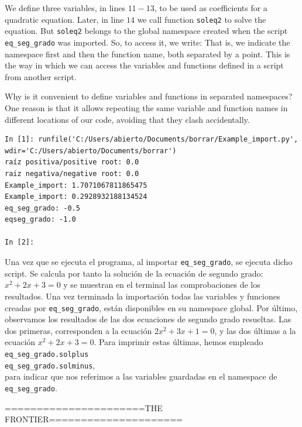 \begin{paracol}{2}
We define three variables, in lines $11 - 13$, to be used as coefficients for a quadratic equation. Later, in line $14$ we call function \texttt{soleq2} to solve the equation. But \texttt{soleq2} belongs to the global namespace created when the script \texttt{eq_seg_grado} was imported. So, to access it, we write:
That is, we indicate the namespace first and then the function name, both separated by a point. This is the way in which we can access the variables and functions defined in a script from another script. 

Why is it convenient to define variables and functions in separated namespaces? One reason is that it allows repeating the same variable and function names in different locations of our code, avoiding that they clash accidentally.   



\end{paracol}

\begin{verbatim}
In [1]: runfile('C:/Users/abierto/Documents/borrar/Example_import.py',
wdir='C:/Users/abierto/Documents/borrar')
raíz positiva/positive root: 0.0
raiz negativa/negative root: 0.0
Example_import: 1.7071067811865475
Example_import: 0.2928932188134524
eq_seg_grado: -0.5
eqseg_grado: -1.0

In [2]: 
\end{verbatim}
\begin{paracol}{2}
Una vez que se ejecuta el programa, al importar \texttt{eq_seg_grado}, se ejecuta dicho script. Se calcula por tanto la solución de la ecuación de segundo grado: $x^2+2x+3=0$ y se muestran en el terminal las comprobaciones de los resultados. Una vez terminada la importación todas las variables y funciones creadas por \texttt{eq_seg_grado}, están disponibles en su namespace global. Por último, observamos los resultados de las dos ecuaciones de segundo grado resueltas. Las dos primeras, corresponden a la ecuación $2x^2+3x+1=0$, y las dos últimas a la ecuación $x^2+2x+3=0$. Para imprimir estas últimas, hemos empleado \texttt{eq_seg_grado.solplus}\\
\texttt{eq_seg_grado.solminus},\\ 
para indicar que nos referimos a las variables guardadas en el namespace de \texttt{eq_seg_grado}.
\end{paracol}
======================THE FRONTIER=====================


